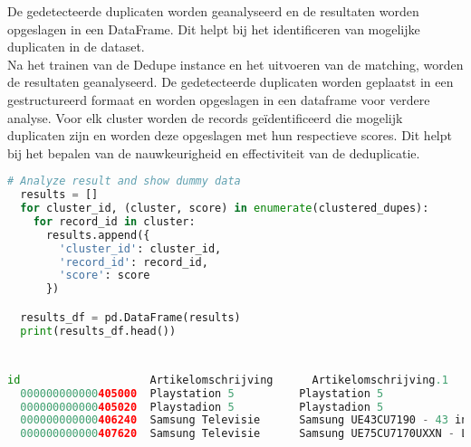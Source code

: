 De gedetecteerde duplicaten worden geanalyseerd en de resultaten worden opgeslagen in een DataFrame. Dit helpt bij het identificeren van mogelijke duplicaten in de dataset. 
\\Na het trainen van de Dedupe instance en het uitvoeren van de matching, worden de resultaten geanalyseerd. De gedetecteerde duplicaten worden geplaatst in een gestructureerd formaat en worden opgeslagen in een dataframe voor verdere analyse. Voor elk cluster worden de records geïdentificeerd  die mogelijk duplicaten zijn en worden deze opgeslagen met hun respectieve scores. Dit helpt bij het bepalen van de nauwkeurigheid en effectiviteit van de deduplicatie.
\begin{lstlisting}[language=Python, caption={Identificeren van mogelijke duplicaten in de dataset}]
  # Analyze result and show dummy data
  results = []
  for cluster_id, (cluster, score) in enumerate(clustered_dupes):
    for record_id in cluster:
      results.append({
        'cluster_id': cluster_id,
        'record_id': record_id,
        'score': score
      })

  results_df = pd.DataFrame(results)
  print(results_df.head())
\end{lstlisting}

\section{}%
\label{sec:analyseResultatenPOC}

\begin{lstlisting}[language=Python, caption={Output dedupe dataframe}]
  id	                Artikelomschrijving		 Artikelomschrijving.1 	                                      Voorts.gem.prijs	cluster_id	record_id		score
  000000000000405000  Playstation 5          Playstation 5	                                              499,00	          1	          255	         0.50913
  000000000000405020  Playstadion 5          Playstadion 5	                                              499,00	          1	          345	         0.50913
  000000000000406240  Samsung Televisie      Samsung UE43CU7190 - 43 inch - 4K LED - 2023                 589,00	          2	          726	         0.34925
  000000000000407620  Samsung Televisie      Samsung UE75CU7170UXXN - LED - 75- 4K Ultra HD - Smart TV  599,00	          2	          27	         0.34259
\end{lstlisting}

